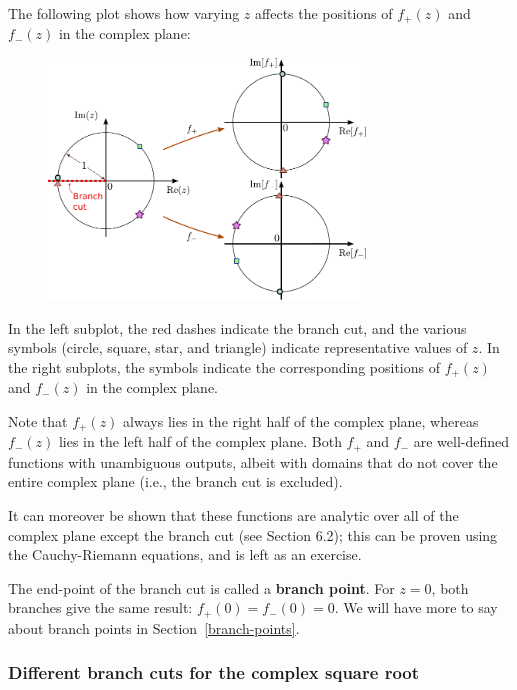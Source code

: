 \documentclass[10pt,a4paper]{article}
\begin{document}
\noindent
The following plot shows how varying $z$ affects the positions of
$f_+(z)$ and $f_-(z)$ in the complex plane:

\begin{figure}[h]
  \centering\includegraphics[width=0.75\textwidth]{complex_root_1}
\end{figure}

\noindent
In the left subplot, the red dashes indicate the branch cut, and the
various symbols (circle, square, star, and triangle) indicate
representative values of $z$.  In the right subplots, the symbols
indicate the corresponding positions of $f_+(z)$ and $f_-(z)$ in the
complex plane.

Note that $f_+(z)$ always lies in the right half of the complex plane,
whereas $f_-(z)$ lies in the left half of the complex plane. Both
$f_+$ and $f_-$ are well-defined functions with unambiguous outputs,
albeit with domains that do not cover the entire complex plane (i.e.,
the branch cut is excluded).

It can moreover be shown that these functions are analytic over all of
the complex plane except the branch cut (see Section 6.2); this can be
proven using the Cauchy-Riemann equations, and is left as an exercise.

The end-point of the branch cut is called a \textbf{branch point}. For
$z = 0$, both branches give the same result: $f_+(0) = f_-(0) = 0$. We
will have more to say about branch points in
Section~\ref{branch-points}.

\subsubsection{Different branch cuts for the complex square root}
\label{different-branch-cuts-for-the-complex-square-root}
\end{document}
